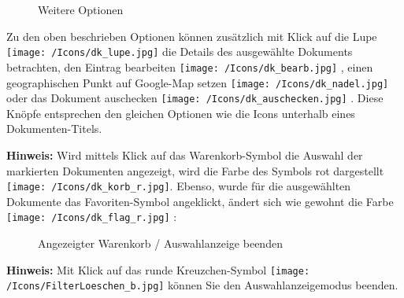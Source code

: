 \begin{figure}[H]
\caption{Weitere Optionen}
\end{figure}

Zu den oben beschrieben Optionen können zusätzlich mit Klick auf die Lupe \texttt{[image: /Icons/dk\_lupe.jpg]}  die Details des ausgewählte Dokuments betrachten, den Eintrag bearbeiten \texttt{[image: /Icons/dk\_bearb.jpg]} , einen geographischen Punkt auf Google-Map setzen \texttt{[image: /Icons/dk\_nadel.jpg]}  oder das Dokument auschecken \texttt{[image: /Icons/dk\_auschecken.jpg]} . Diese Knöpfe entsprechen den gleichen Optionen wie die Icons unterhalb eines Dokumenten-Titels.

\vspace{\baselineskip}

\textbf{Hinweis:} Wird mittels Klick auf das Warenkorb-Symbol die Auswahl der markierten Dokumenten angezeigt, wird die Farbe des Symbols rot dargestellt \texttt{[image: /Icons/dk\_korb\_r.jpg]}. Ebenso, wurde für die ausgewählten Dokumente das Favoriten-Symbol angeklickt, ändert sich wie gewohnt die Farbe \texttt{[image: /Icons/dk\_flag\_r.jpg]} :

\begin{figure}[H]
\caption{Angezeigter Warenkorb / Auswahlanzeige beenden}
\end{figure}

\textbf{Hinweis:} Mit Klick auf das runde Kreuzchen-Symbol \texttt{[image: /Icons/FilterLoeschen\_b.jpg]}  können Sie den Auswahlanzeigemodus beenden. 

